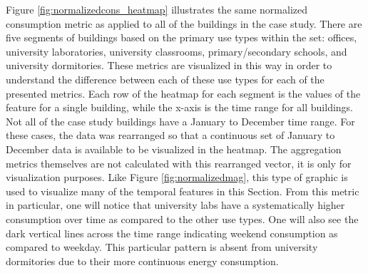 Figure \ref{fig:normalizedcons_heatmap} illustrates the same normalized consumption metric as applied to all of the buildings in the case study. There are five segments of buildings based on the primary use types within the set: offices, university laboratories, university classrooms, primary/secondary schools, and university dormitories. These metrics are visualized in this way in order to understand the difference between each of these use types for each of the presented metrics. Each row of the heatmap for each segment is the values of the feature for a single building, while the x-axis is the time range for all buildings. Not all of the case study buildings have a January to December time range. For these cases, the data was rearranged so that a continuous set of January to December data is available to be visualized in the heatmap. The aggregation metrics themselves are not calculated with this rearranged vector, it is only for visualization purposes. Like Figure \ref{fig:normalizedmag}, this type of graphic is used to visualize many of the temporal features in this Section. From this metric in particular, one will notice that university labs have a systematically higher consumption over time as compared to the other use types. One will also see the dark vertical lines across the time range indicating weekend consumption as compared to weekday. This particular pattern is absent from university dormitories due to their more continuous energy consumption.